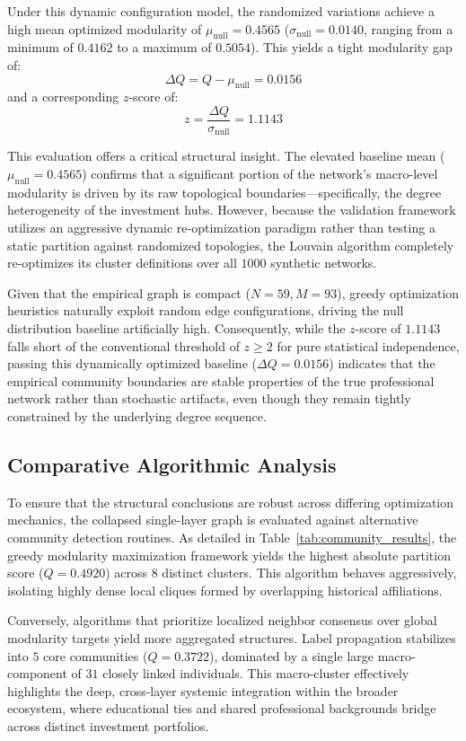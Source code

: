 \documentclass[conference]{IEEEtran}
\begin{document}
Under this dynamic configuration model, the randomized variations achieve a high mean optimized modularity of $\mu_{\text{null}} = 0.4565$ ($\sigma_{\text{null}} = 0.0140$, ranging from a minimum of $0.4162$ to a maximum of $0.5054$). This yields a tight modularity gap of:
$$ \Delta Q = Q - \mu_{\text{null}} = 0.0156 $$
and a corresponding $z$-score of:
$$ z = \frac{\Delta Q}{\sigma_{\text{null}}} = 1.1143 $$

This evaluation offers a critical structural insight. The elevated baseline mean ($\mu_{\text{null}} = 0.4565$) confirms that a significant portion of the network's macro-level modularity is driven by its raw topological boundaries—specifically, the degree heterogeneity of the investment hubs. However, because the validation framework utilizes an aggressive dynamic re-optimization paradigm rather than testing a static partition against randomized topologies, the Louvain algorithm completely re-optimizes its cluster definitions over all $1000$ synthetic networks. 

Given that the empirical graph is compact ($N = 59, M = 93$), greedy optimization heuristics naturally exploit random edge configurations, driving the null distribution baseline artificially high. Consequently, while the $z$-score of $1.1143$ falls short of the conventional threshold of $z \ge 2$ for pure statistical independence, passing this dynamically optimized baseline ($\Delta Q = 0.0156$) indicates that the empirical community boundaries are stable properties of the true professional network rather than stochastic artifacts, even though they remain tightly constrained by the underlying degree sequence.

\subsection{Comparative Algorithmic Analysis}

To ensure that the structural conclusions are robust across differing optimization mechanics, the collapsed single-layer graph is evaluated against alternative community detection routines. As detailed in Table~\ref{tab:community_results}, the greedy modularity maximization framework yields the highest absolute partition score ($Q = 0.4920$) across $8$ distinct clusters. This algorithm behaves aggressively, isolating highly dense local cliques formed by overlapping historical affiliations. 

Conversely, algorithms that prioritize localized neighbor consensus over global modularity targets yield more aggregated structures. Label propagation stabilizes into $5$ core communities ($Q = 0.3722$), dominated by a single large macro-component of $31$ closely linked individuals. This macro-cluster effectively highlights the deep, cross-layer systemic integration within the broader ecosystem, where educational ties and shared professional backgrounds bridge across distinct investment portfolios. 
\end{document}
